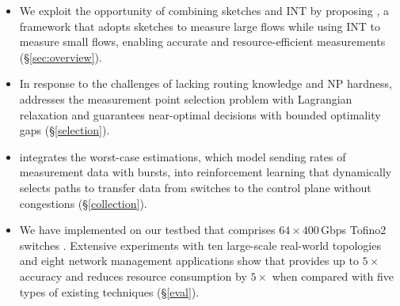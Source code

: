 \begin{itemize}[leftmargin=*]
%
%
    \item We exploit the opportunity of combining sketches and INT by proposing \sysname, a framework that adopts sketches to measure large flows while using INT to measure small flows, enabling accurate and resource-efficient measurements (\S\ref{sec:overview}). 
%
%
%
    \item In response to the challenges of lacking routing knowledge and NP hardness, \sysname addresses the measurement point selection problem with Lagrangian relaxation and guarantees near-optimal decisions with bounded optimality gaps (\S\ref{selection}). 
%
    \item \sysname integrates the worst-case estimations, which model sending rates of measurement data with bursts, into reinforcement learning that dynamically selects paths to transfer data from switches to the control plane without congestions (\S\ref{collection}).
%
    \item We have implemented \sysname on our testbed that comprises $64\times 400$\,Gbps Tofino2 switches \cite{tofino2}. Extensive experiments with ten large-scale real-world topologies and eight network management applications show that \sysname provides up to $5\times$ accuracy and reduces resource consumption by $5\times$ when compared with five types of existing techniques (\S\ref{eval}).
%
\end{itemize}


